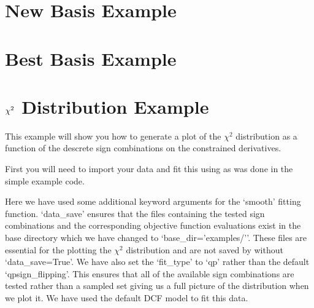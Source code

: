 \documentclass[letterpaper,10pt,english]{sphinxmanual}
\begin{document}
\section{New Basis Example}
\label{\detokenize{source/maxsmooth:new-basis-example}}

\section{Best Basis Example}
\label{\detokenize{source/maxsmooth:best-basis-example}}

\section{\protect\({\chi^2}\protect\) Distribution Example}
\label{\detokenize{source/maxsmooth:chi-2-distribution-example}}
This example will show you how to generate a plot of the \({\chi^2}\)
distribution as a function of the descrete sign combinations on the constrained
derivatives.

First you will need to import your data and fit this using  as
was done in the simple example code.

\begin{sphinxVerbatim}[commandchars=\\\{\}]
   

  
  

   

  
     
   
\end{sphinxVerbatim}

Here we have used some additional keyword arguments for the ‘smooth’ fitting
function. ‘data\_save’ ensures that the files containing the tested sign combinations
and the corresponding objective function evaluations exist in the base directory
which we have changed to ‘base\_dir=’examples/’’. These files are essential for
the plotting the \({\chi^2}\) distribution and are not saved by 
without ‘data\_save=True’. We have also set the ‘fit\_type’ to ‘qp’ rather than the
default ‘qp\sphinxhyphen{}sign\_flipping’. This ensures that all of the available sign
combinations are tested rather than a sampled set giving us a full picture of the
distribution when we plot it. We have used the default DCF model to fit this data.
\end{document}
